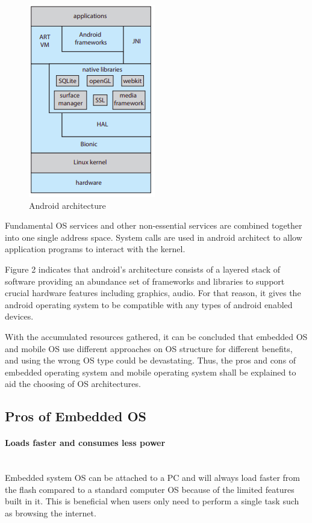\documentclass[conference]{IEEEtran}
\newcommand{\forceindent}{\leavevmode{\parindent=1em\indent}}
\begin{document}
\begin{figure}[h]
  \caption{Android architecture}
\begin{center}
\includegraphics[scale=0.5]{./images/Android_architecture.png}
\end{center}
\end{figure}

\forceindent Fundamental OS services and other non-essential services are combined together into one single address space\cite{Galvinbook}. System calls are used in android architect to allow application programs to interact with the kernel\cite{TDDBM}.

\forceindent Figure 2 indicates that android’s architecture consists of a layered stack of software providing an abundance set of frameworks and libraries to support crucial hardware features including graphics, audio\cite{Galvinbook}. For that reason, it gives the android operating system to be compatible with any types of android enabled devices.

\forceindent With the accumulated resources gathered, it can be concluded that embedded OS and mobile OS use different approaches on OS structure for different benefits, and using the wrong OS type could be devastating. Thus, the pros and cons of embedded operating system and mobile operating system shall be explained to aid the choosing of OS architectures.

\subsection{Pros of Embedded OS}
\paragraph{Loads faster and consumes less power} \mbox{} \\
\forceindent Embedded system OS can be attached to a PC and will always load faster from the flash compared to a standard computer OS because of the limited features built in it. This is beneficial when users only need to perform a single task such as browsing the internet.\cite{TDDBM}
\end{document}
